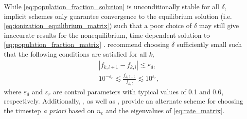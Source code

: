 While \autoref{eq:population_fraction_solution} is unconditionally stable for all $\delta$, implicit schemes only guarantee convergence to the equilibrium solution (i.e. \autoref{eq:ionization_equilibrium_matrix}) such that a poor choice of $\delta$ may still give inaccurate results for the nonequilibrium, time-dependent solution to \autoref{eq:population_fraction_matrix} \citep{bradshaw_numerical_2009}. \citet{macneice_numerical_1984} recommend choosing $\delta$ sufficiently small such that the following conditions are satisfied for all $k$,
\begin{align}
    &|f_{k,l+1} - f_{k,l}| \lesssim \varepsilon_d, \\
    &10^{-\varepsilon_r} \lesssim \frac{f_{k,l+1}}{f_{k,l}} \lesssim 10^{\varepsilon_r},
\end{align}
where $\varepsilon_d$ and $\varepsilon_r$ are control parameters with typical values of 0.1 and 0.6, respectively. Additionally, \citet{masai_x-ray_1984}, as well as \citet{shen_lagrangian_2015}, provide an alternate scheme for choosing the timestep \textit{a priori} based on $n_e$ and the eigenvalues of \autoref{eq:rate_matrix}.

